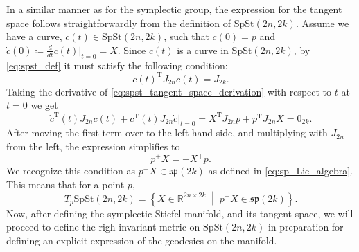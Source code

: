 In a similar manner as for the symplectic group, the expression for the tangent space follows straightforwardly from the definition of $\mathrm{SpSt}(2n, 2k)$. Assume we have a curve, $c(t)\in \mathrm{SpSt}(2n,2k)$, such that $c(0)=p$ and $\dot{c}(0)\coloneqq\tfrac{d}{dt}c(t)|_{t=0}=X$. Since $c(t)$ is a curve in $\mathrm{SpSt}(2n,2k)$, by \eqref{eq:spst_def} it must satisfy the following condition:
\begin{equation}\label{eq:spst_tangent_space_derivation}
    c(t) ^{\mathrm{T}}J_{2n}c(t)=J_{2k}.
\end{equation}
Taking the derivative of \eqref{eq:spst_tangent_space_derivation} with respect to $t$ at $t=0$ we get
\begin{equation*}
    \dot{c}^{\mathrm{T}}(t)J_{2n}c(t)+c^{\mathrm{T}}(t)J_{2n}\dot{c}\big|_{t=0}=X ^{\mathrm{T}}J_{2n}p+p ^{\mathrm{T}}J_{2n}X=0_{2k}.
\end{equation*}
After moving the first term over to the left hand side, and multiplying with $J_{2n}$ from the left, the expression simplifies to
\begin{equation*}
    p^{+}X=-X^{+}p.
\end{equation*}
We recognize this condition as $p^{+}X\in \mathfrak{sp}(2k)$ as defined in \eqref{eq:sp_Lie_algebra}. This means that for a point $p$, 
\begin{equation}\label{eq:spst_tangent_space}
    T_{p}\mathrm{SpSt}(2n,2k)=\left\{X\in \mathbb{R}^{2n\times2k}\;\middle|\;p^{+}X\in\mathfrak{sp}(2k)\right\}.
\end{equation}
Now, after defining the symplectic Stiefel manifold, and its tangent space, we will proceed to define the righ-invariant metric on $\mathrm{SpSt}(2n, 2k)$ in preparation for defining an explicit expression of the geodesics on the manifold. 
